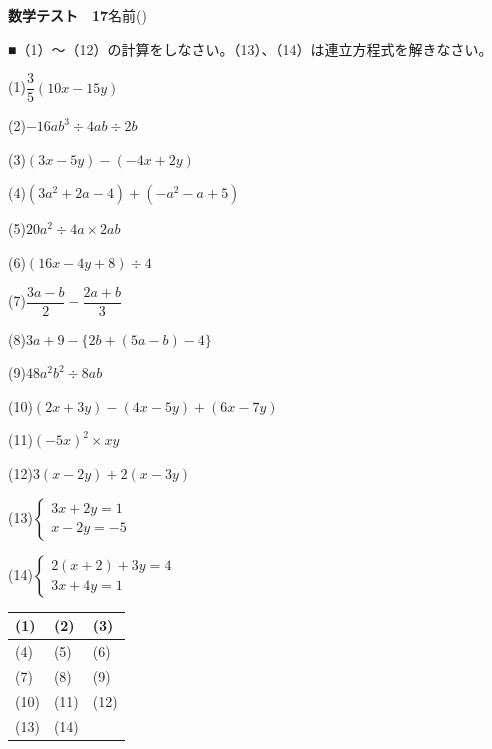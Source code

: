 \documentclass[a4paper,11pt]{ltjsarticle}
\newlength{\qcol}\setlength{\qcol}{0.47\textwidth}
\newlength{\qgap}
\newlength{\anscolw}\setlength{\anscolw}{0.30\textwidth}
\newlength{\ansh}
\newcommand{\Q}[2]{\parbox[t]{\qcol}{\raggedright (#1)\hspace{0.6em}$\displaystyle #2$}}
\newcommand{\QR}[4]{\Q{#1}{#2}\hfill\Q{#3}{#4}\par\vspace{\qgap}}
\newcommand{\anscell}[1]{\rule[-\ansdrop]{0pt}{\ansh}(#1)}
\newlength{\ansdrop}
\begin{document}
{\large\bfseries 数学テスト　17}\hfill 名前(\underline{\hspace{32mm}})\par\vspace{3mm}
■（1）〜（12）の計算をしなさい。（13）、（14）は連立方程式を解きなさい。\par\vspace{3mm}
\setlength{\qgap}{11mm}
\QR{1}{\dfrac{3}{5}(10x-15y)}{2}{-16ab^3\div4ab\div2b}
\QR{3}{(3x-5y)-(-4x+2y)}{4}{(3a^2+2a-4)+(-a^2-a+5)}
\QR{5}{20a^2\div4a\times2ab}{6}{(16x-4y+8)\div4}
\QR{7}{\dfrac{3a-b}{2}-\dfrac{2a+b}{3}}{8}{3a+9-\{2b+(5a-b)-4\}}
\QR{9}{48a^2b^2\div8ab}{10}{(2x+3y)-(4x-5y)+(6x-7y)}
\QR{11}{(-5x)^2\times xy}{12}{3(x-2y)+2(x-3y)}
\QR{13}{\left\{\begin{array}{l} 3x+2y=1 \\ x-2y=-5 \end{array}\right.}{14}{\left\{\begin{array}{l} 2(x+2)+3y=4 \\ 3x+4y=1 \end{array}\right.}
\vfill
\setlength{\ansh}{12mm}\setlength{\ansdrop}{8mm}%
\begin{center}\begin{tabular}{|p{\anscolw}|p{\anscolw}|p{\anscolw}|}\hline
\anscell{1} & \anscell{2} & \anscell{3} \\\hline
\anscell{4} & \anscell{5} & \anscell{6} \\\hline
\anscell{7} & \anscell{8} & \anscell{9} \\\hline
\anscell{10} & \anscell{11} & \anscell{12} \\\hline
\anscell{13} & \anscell{14} &  \\\hline
\end{tabular}\end{center}
\end{document}
